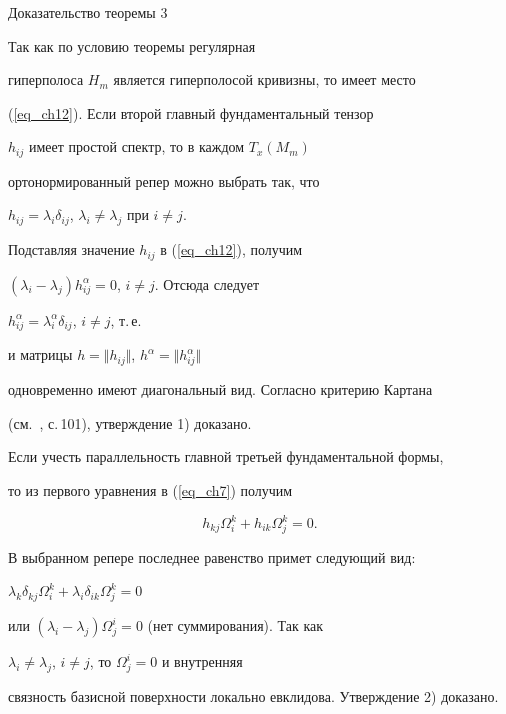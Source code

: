 \begin{pf*}{Доказательство теоремы 3}


Так как по условию теоремы регулярная


гиперполоса $H_m$ является гиперполосой кривизны, то имеет место


(\ref{eq_ch12}). Если второй главный фундаментальный тензор


$h_{ij}$ имеет простой спектр, то в каждом $T_x(M_m)$


ортонормированный репер можно выбрать так, что


$h_{ij}=\lambda_i\delta_{ij}$, $\lambda_i\neq\lambda_j$ при $i\neq j$. 


Подставляя значение $h_{ij}$ в (\ref{eq_ch12}), получим


$(\lambda_i-\lambda_j)h^{\alpha}_{ij}=0$, $i\neq j$. Отсюда следует


$h^{\alpha}_{ij}=\lambda^{\alpha}_i\delta_{ij}$, $i\neq j$, т.\,е.


и матрицы $h=\Vert h_{ij}\Vert$, $h^{\alpha}=\Vert h^{\alpha}_{ij}\Vert$ 


одновременно имеют диагональный вид. Согласно критерию Картана


(см.~\cite{chak7}, с.\,101), утверждение 1) доказано.





Если учесть параллельность главной третьей фундаментальной формы,


то из первого уравнения в (\ref{eq_ch7}) получим


$$


h_{kj}\Omega^k_i+h_{ik}\Omega^k_j=0.


$$


В выбранном репере последнее равенство примет следующий вид:


$\lambda_k\delta_{kj}\Omega^k_i+\lambda_i\delta_{ik}\Omega^k_j=0$


или $(\lambda_i-\lambda_j)\Omega^i_j=0$ (нет суммирования). Так как


$\lambda_i\neq\lambda_j$, $i\neq j$, то $\Omega^i_j=0$ и внутренняя 


связность базисной поверхности локально евклидова. Утверждение 2) доказано.


\end{pf*}








